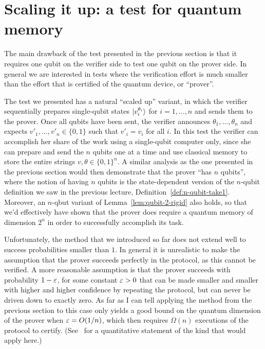 \section{Scaling it up: a test for quantum memory}

The main drawback of the test presented in the previous section is that it requires one qubit on the verifier side to test one qubit on the prover side. In general we are interested in tests where the verification effort is much smaller than the effort that is certified of the quantum device, or ``prover''. 

The test we presented has a natural ``scaled up'' variant, in which the verifier sequentially prepares single-qubit states $|v_i^{\theta_i}\rangle$ for $i=1,\ldots,n$ and sends them to the prover. Once all qubits have been sent, the verifier announces $\theta_1,\ldots,\theta_n$ and expects $v'_1,\ldots,v'_n \in \{0,1\}$ such that $v'_i=v_i$ for all $i$. In this test the verifier can accomplish her share of the work using a single-qubit computer only, since she can prepare and send the $n$ qubits one at a time and use classical memory to store the entire strings $v,\theta\in\{0,1\}^n$. A similar analysis as the one presented in the previous section would then demonstrate that the prover ``has $n$ qubits'', where the notion of having $n$ qubits is the state-dependent version of the $n$-qubit definition we saw in the previous lecture, Definition~\ref{def:n-qubit-take1}. Moreover, an $n$-qbut variant of Lemma~\ref{lem:qubit-2-rigid} also holds, so that we'd effectively have shown that the prover does require a quantum memory of dimension $2^n$ in order to successfully accomplish its task. 

Unfortunately, the method that we introduced so far does not extend well to success probabilities smaller than $1$. In general it is unrealistic to make the assumption that the prover succeeds perfectly in the protocol, as this cannot be verified. A more reasonable assumption is that the prover succeeds with probability $1-\varepsilon$, for some constant $\varepsilon>0$ that can be made smaller and smaller with higher and higher confidence by repeating the protocol, but can never be driven down to exactly zero. As far as I can tell applying the method from the previous section to this case only yields a good bound on the quantum dimension of the prover when $\varepsilon =O(1/n)$, which then requires $\Omega(n)$ executions of the protocol to certify. (See~\cite[Theorem 2.1]{chao2018test} for a quantitative statement of the kind that would apply here.)

